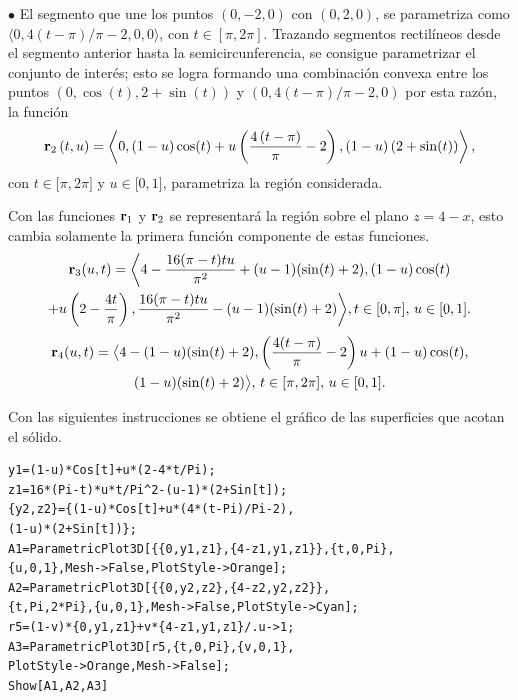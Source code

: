 $\bullet$ El segmento que une los puntos $\left(0,-2,0 \right) $ con $\left(0,2,0 \right)$,
se parametriza como $\langle 0,4(t-\pi)/\pi-2,0,0 \rangle $,
con $t\in [\pi ,2\pi ]$. Trazando segmentos rectilíneos desde el segmento anterior
hasta la semicircunferencia, se consigue parametrizar el conjunto de interés; esto se logra
formando una combinación convexa entre los puntos
$(0,\cos (t),2+\sin (t))$ y $(0,4(t-\pi)/\pi-2,0)$ por esta razón, la función
$${\bf r}_2\left( t,u\right)  = \left\langle 0,\left(
1-u\right) \cos (t) +u\left( \frac{4\left( t-\pi \right) }{\pi }%
-2\right) ,\left( 1-u\right) \left( 2+\sin (t) \right)
\right\rangle ,$$ con $t\in \lbrack \pi ,2\pi ]$ y $u\in \lbrack 0,1]$, parametriza la región considerada.

Con las funciones ${\bf r}_1$ y ${\bf r}_2$ se representará la región sobre el
plano $z=4-x$, esto cambia solamente la primera función componente de estas funciones.
\begin{multline*}
{\bf r}_3(u,t)=\bigg \langle 4-\frac{16 (\pi-t) t u}{\pi ^2}+(u-1) (\sin (t)+2),
(1-u)\cos (t) \\ +u\left(2-\frac{4t}{\pi}\right), \frac{16 (\pi -t) t u}{\pi ^2}-(u-1) (\sin (t)+2) \bigg\rangle, t\in[0,\pi],\, u\in[0,1].
\end{multline*}
\begin{multline*}
{\bf r}_4(u,t)= \big \langle 4-(1-u)(\sin(t)+2),\left(\frac{4(t-\pi)}{\pi}-2\right)u+(1-u)\cos(t),\\
(1-u)(\sin (t)+2)\big \rangle,\,t\in[\pi,2\pi],\, u\in[0,1].
\end{multline*}

Con las siguientes instrucciones se obtiene el gráfico de las superficies que acotan el sólido.

\begin{tcolorbox}[title=\bf Instrucción \verb"Mathematica"]
\begin{Verbatim}[formatcom=\letraverbatim]
y1=(1-u)*Cos[t]+u*(2-4*t/Pi);
z1=16*(Pi-t)*u*t/Pi^2-(u-1)*(2+Sin[t]);
{y2,z2}={(1-u)*Cos[t]+u*(4*(t-Pi)/Pi-2),
(1-u)*(2+Sin[t])};
A1=ParametricPlot3D[{{0,y1,z1},{4-z1,y1,z1}},{t,0,Pi},
{u,0,1},Mesh->False,PlotStyle->Orange];
A2=ParametricPlot3D[{{0,y2,z2},{4-z2,y2,z2}},
{t,Pi,2*Pi},{u,0,1},Mesh->False,PlotStyle->Cyan];
r5=(1-v)*{0,y1,z1}+v*{4-z1,y1,z1}/.u->1;
A3=ParametricPlot3D[r5,{t,0,Pi},{v,0,1},
PlotStyle->Orange,Mesh->False];
Show[A1,A2,A3]
\end{Verbatim}
\end{tcolorbox}

